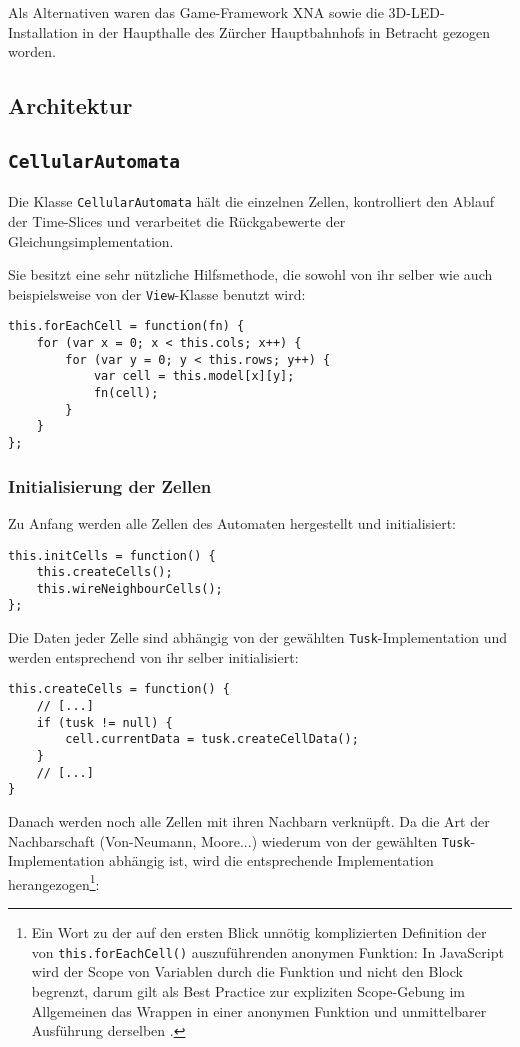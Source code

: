 \documentclass[11pt]{article} %
\theoremstyle{definition}
\begin{document}
Als Alternativen waren das Game-Framework XNA sowie die 3D-LED-Installation in der Haupthalle des Zürcher Hauptbahnhofs in Betracht gezogen worden.

\subsection{Architektur}

\subsection{\tt CellularAutomata}

Die Klasse {\tt CellularAutomata} hält die einzelnen Zellen, kontrolliert den Ablauf der Time-Slices und verarbeitet die Rückgabewerte der Gleichungsimplementation.

Sie besitzt eine sehr nützliche Hilfsmethode, die sowohl von ihr selber wie auch beispielsweise von der {\tt View}-Klasse benutzt wird:

\begin{lstlisting}
this.forEachCell = function(fn) {
	for (var x = 0; x < this.cols; x++) {
		for (var y = 0; y < this.rows; y++) {
			var cell = this.model[x][y];
			fn(cell);
		}
	}
};
\end{lstlisting}

\subsubsection{Initialisierung der Zellen}

Zu Anfang werden alle Zellen des Automaten hergestellt und initialisiert:
\begin{lstlisting}
this.initCells = function() {
	this.createCells();
	this.wireNeighbourCells();
};
\end{lstlisting}

Die Daten jeder Zelle sind abhängig von der gewählten {\tt Tusk}-Implementation und werden entsprechend von ihr selber initialisiert:

\begin{lstlisting}
this.createCells = function() {
	// [...]
	if (tusk != null) {
		cell.currentData = tusk.createCellData();
	}
	// [...]
}
\end{lstlisting}

Danach werden noch alle Zellen mit ihren Nachbarn verknüpft. Da die Art der Nachbarschaft (Von-Neumann, Moore...) wiederum von der gewählten {\tt Tusk}-Implementation abhängig ist, wird die entsprechende Implementation herangezogen\footnote{Ein Wort zu der auf den ersten Blick unnötig komplizierten Definition der von {\tt this.forEachCell()} auszuführenden anonymen Funktion: In JavaScript wird der Scope von Variablen durch die Funktion und nicht den Block begrenzt, darum gilt als Best Practice zur expliziten Scope-Gebung im Allgemeinen das Wrappen in einer anonymen Funktion und unmittelbarer Ausführung derselben \cite{UnderstandingClosures}.}:
\end{document}
